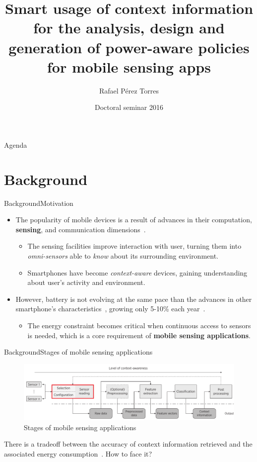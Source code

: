 \documentclass[10pt,xcolor={dvipsnames}]{beamer}
\title[Smart usage of context information for the analysis, design and generation of power-aware policies for MSA's]{Smart usage of context information for the analysis, design and generation of power-aware policies for mobile sensing apps}
\date{Doctoral seminar 2016}
\author{
  Rafael Pérez Torres
}
\institute[
  ITL Information Technology Laboratory\\
  Cinvestav\\
  Tamaulipas
] %
{%
  Dr. César Torres Huitzil\\
  Dr. Hiram Galeana Zapién\\

  LTI Cinvestav
  
}
\begin{document}
{\aauwavesbg%
\begin{frame} %
  \titlepage
\end{frame}}

\begin{frame}{Agenda}{}
\tableofcontents
\end{frame}

\section{Background}
\begin{frame}{Background}{Motivation}
\begin{itemize}
  \item<1-> The popularity of mobile devices is a result of advances in their computation, \textbf{sensing}, and communication dimensions~\cite{Islam2014}.
  \begin{itemize}
    \item<1-> The sensing facilities improve interaction with user, turning them into \emph{omni-sensors} able to \emph{know} about its surrounding environment.
    \item<2-> Smartphones have become \emph{context-aware} devices, gaining understanding about user's activity and environment.
  \end{itemize}
  \item<3-> However, battery is not evolving at the same pace than the advances in other smartphone's characteristics~\cite{Kjaergaard2012}, growing only 5-10\% each year~\cite{Ma2012,Evarts2015}.
  \begin{itemize}
    \item The energy constraint becomes critical when continuous access to sensors is needed, which is a core requirement of \textbf{mobile sensing applications}. 
  \end{itemize}
\end{itemize}
\end{frame}

\begin{frame}{Background}{Stages of mobile sensing applications}
\begin{figure}%
  \centering
  \includegraphics[width=\textwidth]{vectors/msa-stages}
  \caption{Stages of mobile sensing applications}
  \label{fig:msa-stages}
\end{figure}
There is a tradeoff between the accuracy of context information retrieved and the associated energy consumption~\cite{Sim2014,Rachuri2012}.
How to face it?
\end{frame}
\end{document}
